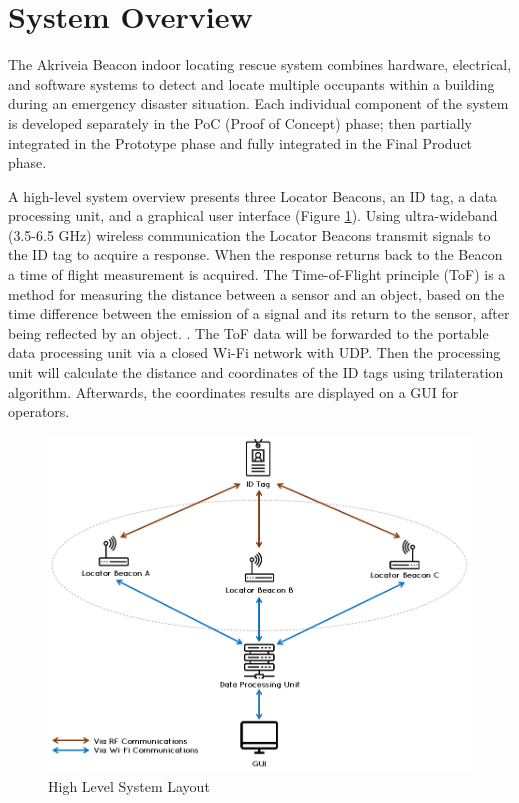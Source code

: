 

\setcounter{section}{1}
\section{System Overview}
\bigskip

The Akriveia Beacon indoor locating rescue system combines hardware, electrical, and software systems to detect and locate multiple occupants within a building during an emergency disaster situation. Each individual component of the system is developed separately in the PoC (Proof of Concept) phase; then partially integrated in the Prototype phase and fully integrated in the Final Product phase. 

\bigskip
A high-level system overview presents three Locator Beacons, an ID tag, a data processing unit, and a graphical user interface (Figure \ref{sys_arch}). Using ultra-wideband (3.5-6.5 GHz) wireless communication the Locator Beacons transmit signals to the ID tag to acquire a response. When the response returns back to the Beacon a time of flight measurement is acquired. The Time-of-Flight principle (ToF) is a method for measuring the distance between a sensor and an object, based on the time difference between the emission of a signal and its return to the sensor, after being reflected by an object. \cite{R2-0}. The ToF data will be forwarded to the portable data processing unit via a closed Wi-Fi network with UDP.  Then the processing unit will calculate the distance and coordinates of the ID tags using trilateration algorithm. Afterwards, the coordinates results are displayed on a GUI for operators.

\medskip
\begin{figure}[H]
\centering
    \includegraphics[scale=0.65]{./images/00_sys_arch.png}
    \caption{High Level System Layout}
    \label{sys_arch}
\end{figure}




